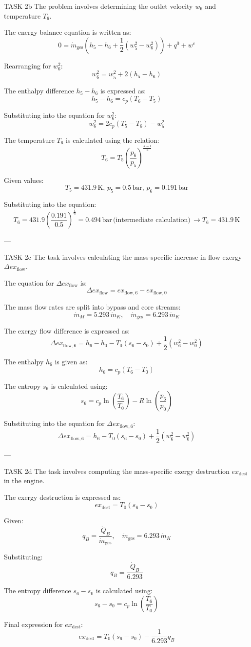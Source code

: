TASK 2b  
The problem involves determining the outlet velocity \( w_6 \) and temperature \( T_6 \).  

The energy balance equation is written as:  
\[
0 = \dot{m}_{\text{ges}} (h_5 - h_6 + \frac{1}{2}(w_5^2 - w_6^2)) + q^0 + w^c
\]  

Rearranging for \( w_6^2 \):  
\[
w_6^2 = w_5^2 + 2(h_5 - h_6)
\]  

The enthalpy difference \( h_5 - h_6 \) is expressed as:  
\[
h_5 - h_6 = c_p (T_6 - T_5)
\]  

Substituting into the equation for \( w_6^2 \):  
\[
w_6^2 = 2 c_p (T_5 - T_6) - w_5^2
\]  

The temperature \( T_6 \) is calculated using the relation:  
\[
T_6 = T_5 \left( \frac{p_6}{p_5} \right)^{\frac{\kappa - 1}{\kappa}}
\]  

Given values:  
\[
T_5 = 431.9 \, \text{K}, \, p_5 = 0.5 \, \text{bar}, \, p_6 = 0.191 \, \text{bar}
\]  

Substituting into the equation:  
\[
T_6 = 431.9 \left( \frac{0.191}{0.5} \right)^{\frac{4}{9}} = 0.494 \, \text{bar} \, \text{(intermediate calculation)} \, \rightarrow T_6 = 431.9 \, \text{K}
\]  

---

TASK 2c  
The task involves calculating the mass-specific increase in flow exergy \( \Delta ex_{\text{flow}} \).  

The equation for \( \Delta ex_{\text{flow}} \) is:  
\[
\Delta ex_{\text{flow}} = ex_{\text{flow},6} - ex_{\text{flow},0}
\]  

The mass flow rates are split into bypass and core streams:  
\[
\dot{m}_M = 5.293 \, \dot{m}_K, \quad \dot{m}_{\text{ges}} = 6.293 \, \dot{m}_K
\]  

The exergy flow difference is expressed as:  
\[
\Delta ex_{\text{flow},6} = h_6 - h_0 - T_0 (s_6 - s_0) + \frac{1}{2}(w_6^2 - w_0^2)
\]  

The enthalpy \( h_6 \) is given as:  
\[
h_6 = c_p (T_6 - T_0)
\]  

The entropy \( s_6 \) is calculated using:  
\[
s_6 = c_p \ln \left( \frac{T_6}{T_0} \right) - R \ln \left( \frac{p_6}{p_0} \right)
\]  

Substituting into the equation for \( \Delta ex_{\text{flow},6} \):  
\[
\Delta ex_{\text{flow},6} = h_6 - T_0 (s_6 - s_0) + \frac{1}{2}(w_6^2 - w_0^2)
\]  

---

TASK 2d  
The task involves computing the mass-specific exergy destruction \( ex_{\text{dest}} \) in the engine.  

The exergy destruction is expressed as:  
\[
ex_{\text{dest}} = T_0 (s_6 - s_0)
\]  

Given:  
\[
q_B = \frac{\dot{Q}_B}{\dot{m}_{\text{ges}}}, \quad \dot{m}_{\text{ges}} = 6.293 \, \dot{m}_K
\]  

Substituting:  
\[
q_B = \frac{\dot{Q}_B}{6.293}
\]  

The entropy difference \( s_6 - s_0 \) is calculated using:  
\[
s_6 - s_0 = c_p \ln \left( \frac{T_6}{T_0} \right)
\]  

Final expression for \( ex_{\text{dest}} \):  
\[
ex_{\text{dest}} = T_0 (s_6 - s_0) - \frac{1}{6.293} q_B
\]  